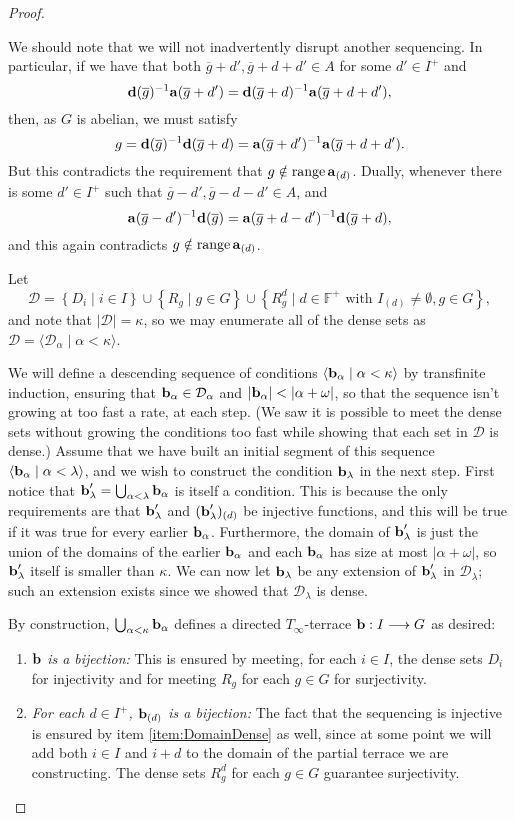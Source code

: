 \documentclass[12pt,a4paper]{article}
\newcommand{\F}{\mathbb{F}}
\DeclareMathOperator{\ran}{range}
\newcommand{\To}{\longrightarrow}
\newcommand{\st}{\; | \;}
\newcommand{\set}[2]{\left\{#1\st #2 \right\}}
\newcommand{\seq}[2]{\langle #1 \st #2 \rangle}
\renewcommand{\a}{\textup{\textbf{a}}}
\renewcommand{\b}{\textup{\textbf{b}}}
\renewcommand{\d}{\textup{\textbf{d}}}
\begin{document}
\begin{proof}
\begin{enumerate}
We should note that we will not inadvertently disrupt another sequencing. In particular, if we have that both $\overline g+d', \overline g+d+d'\in A$ for some $d'\in I^+$ and $$\d(\overline g)^{-1}\a(\overline g+d') = \d(\overline g+d)^{-1}\a(\overline g+d+d'),$$ then, as $G$ is abelian, we must satisfy $$g= \d(\overline g)^{-1}\d(\overline g+d) = \a(\overline g+d')^{-1}\a(\overline g+d+d').$$ But this contradicts the requirement that $g \notin \ran \a_{(d)}$. Dually, whenever there is some $d'\in I^+$ such that $\overline g-d', \overline g-d-d' \in A$, and $$\a(\overline g-d')^{-1}\d(\overline g) = \a(\overline g+d-d')^{-1}\d(\overline g+d),$$ and this again contradicts $g \notin \ran \a_{(d)}$.
\end{enumerate}

Let $$\mathcal D = \set{D_i}{i\in I} \cup \set{R_g}{g\in G} \cup \set{R^d_g}{d \in \F^+\text{ with } I_{(d)}\neq \emptyset, g \in G},$$ and note that $|\mathcal D|=\kappa$, so we may enumerate all of the dense sets as $\mathcal D = \seq{\mathcal D_\alpha}{\alpha<\kappa}$.

We will define a descending sequence of conditions $\seq{\b_\alpha}{\alpha<\kappa}$ by transfinite induction, ensuring that $\b_\alpha\in \mathcal D_\alpha$ and $|\b_\alpha|<|\alpha+\omega|$, so that the sequence isn't growing at too fast a rate, at each step. (We saw it is possible to meet the dense sets without growing the conditions too fast while showing that each set in $\mathcal D$ is dense.) Assume that we have built an initial segment of this sequence $\seq{\b_\alpha}{\alpha<\lambda}$, and we wish to construct the condition $\b_\lambda$ in the next step. First notice that $\b_\lambda'=\bigcup_{\alpha<\lambda}\b_\alpha$ is itself a condition. This is because the only requirements are that $\b_\lambda'$ and $(\b_\lambda')_{(d)}$ be injective functions, and this
will be true if it was true for every earlier $\b_\alpha$. Furthermore, the domain of $\b_\lambda'$ is just the union of the domains of the earlier $\b_\alpha$ and each $\b_\alpha$ has size at most $|\alpha+\omega|$, 
so $\b_\lambda'$ itself is smaller than $\kappa$. We can now let $\b_\lambda$ be any extension of $\b_\lambda'$ in $\mathcal{D}_\lambda$; such an extension exists since we showed that
$\mathcal{D}_\lambda$ is dense.

By construction, $\bigcup_{\alpha<\kappa}\b_\alpha$ defines a directed $T_\infty$-terrace $\b: I \To G$ as desired:

\begin{enumerate}
	\item \emph{$\b$ is a bijection:} This is ensured by meeting, for each $i \in I$, the dense sets $D_i$ for injectivity and for meeting $R_g$ for each $g \in G$ for surjectivity.
	\item \emph{For each $d \in I^+$, $\b_{(d)}$ is a bijection:} The fact that the sequencing is injective is ensured by item \ref{item:DomainDense} as well, since at some point we will add both $i \in I$ and $i+d$ to the domain of the partial terrace we are constructing. The dense sets $R^d_g$ for each $g \in G$ guarantee surjectivity. \qedhere
\end{enumerate}
\end{proof}
\end{document}
